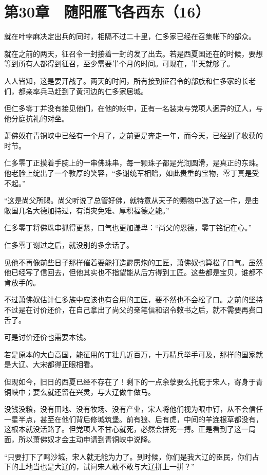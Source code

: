 \section{第30章　随阳雁飞各西东（16）}

就在叶孛麻决定出兵的同时，相隔不过二十里，仁多家已经在召集帐下的部众。

就在之前的两天，征召令一封接着一封的发了出去。若是西夏国还在的时候，要想等到所有人都得到征召，至少需要半个月的时间。可现在，半天就够了。

人人皆知，这是要开战了。两天的时间，所有接到征召令的部族和仁多家的长老们，都亲率兵马赶到了黄河边的仁多家居城。

但仁多零丁并没有接见他们，在他的帐中，正有一名装束与党项人迥异的辽人，与他分庭抗礼的对坐。

萧佛奴在青铜峡中已经有一个月了，之前更是奔走一年，而今天，已经到了收获的时节。

仁多零丁正摸着手腕上的一串佛珠串，每一颗珠子都是光润圆滑，是真正的东珠。他老脸上绽出了一个敦厚的笑容，“多谢统军相赠，如此贵重的宝物，零丁真是受不起。”

“这是尚父所赐。尚父听说了总管好佛，就特意从天子的赐物中选了这一件，是由敝国几名大德加持过，有消灾免难、厚积福德之能。”

仁多零丁将佛珠串抓得更紧，口气也更加谦卑：“尚父的恩德，零丁铭记在心。”

仁多零丁谢过之后，就没别的多余话了。

见他不再像前些日子那样催着要能打造霹雳炮的工匠，萧佛奴也算松了口气。虽然他已经写了信回去，但他其实也不指望能从后方得到工匠。这些都是宝贝，谁都不肯放手的。

不过萧佛奴估计仁多族中应该也有合用的工匠，要不然也不会松了口。之前的坚持不过是在讨价还价，在自己拿出了尚父的亲笔信和诏令敇书之后，就不需要再费口舌了。

可是讨价还价也需要本钱。

若是原本的大白高国，能征用的丁壮几近百万，十万精兵举手可及，那样的国家就是大辽、大宋都得正眼相看。

但现如今，旧日的西夏已经不存在了！剩下的一点余孽要么托庇于宋人，寄身于青铜峡中；要么就还留在兴灵，与大辽做牛做马。

没钱没粮，没有田地、没有牧场、没有产业，宋人将他们视为眼中钉，从不会信任一星半点，甚至在他们背后修城筑堡。前有狼、后有虎，中间的羊连根草都没有，这根本就没活路了。但党项人不甘心就死，必然会拼死一搏。正是看到了这一局面，所以萧佛奴才会主动申请到青铜峡中说降。

“只要打下了鸣沙城，宋人就无能为力了。到时候，你们是我大辽的臣民，你们占下的土地当也是大辽的，试问宋人敢不敢与大辽拼上一拼？”

